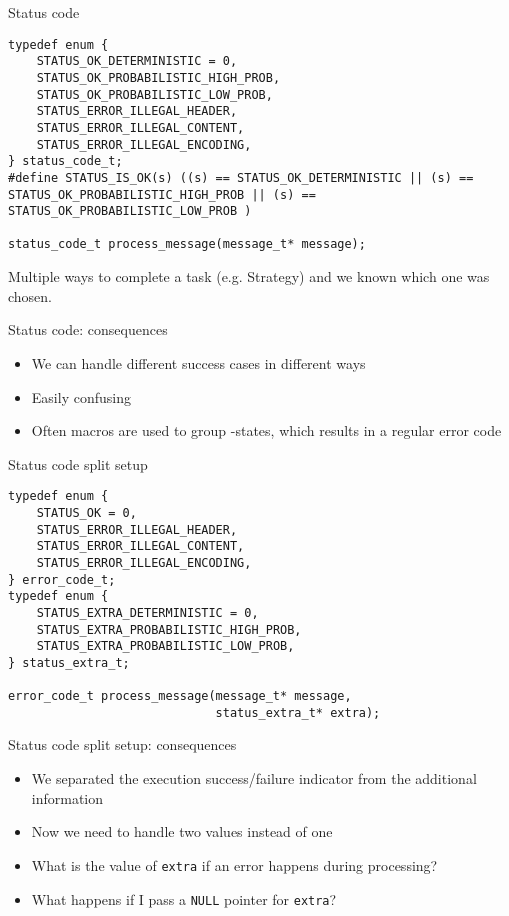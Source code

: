 \documentclass[aspectratio=169,14pt]{beamer}
\begin{document}
\begin{frame}[fragile]{Status code}
\begin{lstlisting}[style=cstyle]
typedef enum {
    STATUS_OK_DETERMINISTIC = 0,
    STATUS_OK_PROBABILISTIC_HIGH_PROB,
    STATUS_OK_PROBABILISTIC_LOW_PROB,
    STATUS_ERROR_ILLEGAL_HEADER,
    STATUS_ERROR_ILLEGAL_CONTENT,
    STATUS_ERROR_ILLEGAL_ENCODING,
} status_code_t;
#define STATUS_IS_OK(s) ((s) == STATUS_OK_DETERMINISTIC || (s) == STATUS_OK_PROBABILISTIC_HIGH_PROB || (s) == STATUS_OK_PROBABILISTIC_LOW_PROB )

status_code_t process_message(message_t* message);
\end{lstlisting}

Multiple ways to complete a task (e.g. Strategy) and we known which one was chosen.
\end{frame}



\begin{frame}[fragile]{Status code: consequences}
\begin{itemize}
    \item[\good] We can handle different success cases in different ways
    \item[\bad] Easily confusing
    \item[\bad] Often macros are used to group -states, which results in a regular error code
\end{itemize}
\end{frame}



\begin{frame}[fragile]{Status code split setup}
\begin{lstlisting}[style=cstyle]
typedef enum {
    STATUS_OK = 0,
    STATUS_ERROR_ILLEGAL_HEADER,
    STATUS_ERROR_ILLEGAL_CONTENT,
    STATUS_ERROR_ILLEGAL_ENCODING,
} error_code_t;
typedef enum {
    STATUS_EXTRA_DETERMINISTIC = 0,
    STATUS_EXTRA_PROBABILISTIC_HIGH_PROB,
    STATUS_EXTRA_PROBABILISTIC_LOW_PROB,
} status_extra_t;

error_code_t process_message(message_t* message,
                             status_extra_t* extra);
\end{lstlisting}
\end{frame}



\begin{frame}[fragile]{Status code split setup: consequences}
\begin{itemize}
    \item[\good] We separated the execution success/failure indicator from the additional information
    \item[\bad] Now we need to handle two values instead of one
    \item[\bad] What is the value of \texttt{extra} if an error happens during processing?
    \item[\meh] What happens if I pass a \texttt{NULL} pointer for \texttt{extra}?
\end{itemize}
\end{frame}
\end{document}
